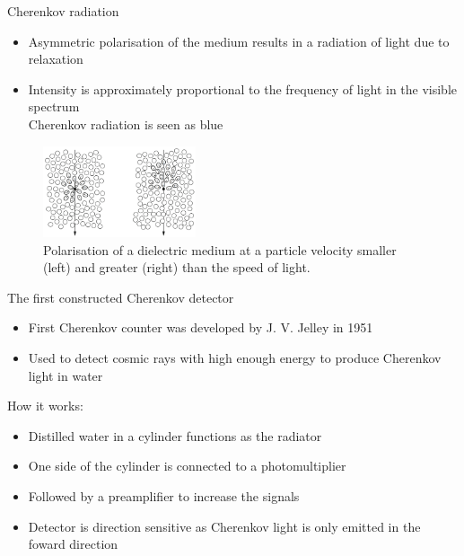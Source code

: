 \documentclass[aspectratio=1610, 10pt]{beamer}
\begin{document}
\begin{frame}{Cherenkov radiation}
  \begin{itemize}
    \item Asymmetric polarisation of the medium results in a radiation of light due to relaxation
    \medskip
    \item Intensity is approximately proportional to the frequency of light in the visible spectrum \\
    \rightarrow Cherenkov radiation is seen as blue
    \medskip
  \end{itemize}
  \begin{figure}
    \includegraphics[width=0.4\textwidth]{images/polarisation.png}
    \caption{Polarisation of a dielectric medium at a particle velocity smaller (left) and greater (right) than the speed of light.}
  \end{figure}
\end{frame}



\begin{frame}{The first constructed Cherenkov detector}
  \begin{itemize}
    \item First Cherenkov counter was developed by J. V. Jelley in 1951
    \medskip
    \item Used to detect cosmic rays with high enough energy to produce Cherenkov light in water
    \medskip \\
  \end{itemize}
\vspace{0.5cm}
How it works:
  \begin{itemize}
    \item Distilled water in a cylinder functions as the radiator
    \medskip
    \item One side of the cylinder is connected to a photomultiplier
    \medskip
    \item Followed by a preamplifier to increase the signals
    \medskip
    \item Detector is direction sensitive as Cherenkov light is only emitted in the foward direction
  \end{itemize}
\end{frame}
\end{document}
